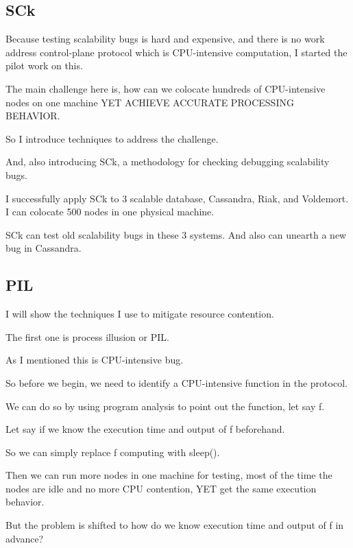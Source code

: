 
\subsection{SCk}

Because testing scalability bugs is hard and expensive, and there is no work
address control-plane protocol which is CPU-intensive computation, I started the
pilot work on this.

The main challenge here is, how can we colocate hundreds of CPU-intensive nodes
on one machine YET ACHIEVE ACCURATE PROCESSING BEHAVIOR.

So I introduce techniques to address the challenge.

And, also introducing SCk, a methodology for checking debugging scalability
bugs.

I successfully apply SCk to 3 scalable database, Cassandra, Riak, and Voldemort.
I can colocate 500 nodes in one physical machine.

SCk can test old scalability bugs in these 3 systems. And also can unearth a new
bug in Cassandra.

\subsection{PIL}

I will show the techniques I use to mitigate resource contention.

The first one is process illusion or PIL. 


As I mentioned this is CPU-intensive bug. 

So before we begin, we need to identify a CPU-intensive function in the
protocol.

We can do so by using program analysis to point out the function, let say f.

Let say if we know the execution time and output of f beforehand.

So we can simply replace f computing with sleep(). 

Then we can run more nodes in one machine for testing, most of the time the
nodes are idle and no more CPU contention, YET get the same execution behavior.

But the problem is shifted to how do we know execution time and output of f in
advance?

